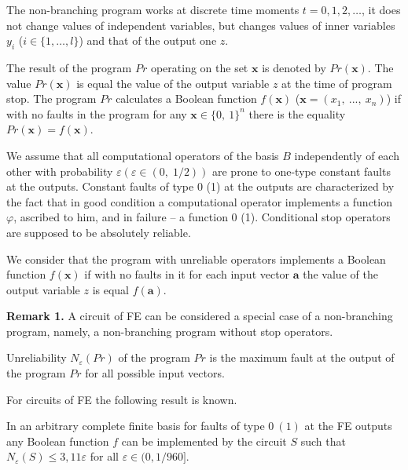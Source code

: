 \documentclass[
11pt,%
tightenlines,%
twoside,%
onecolumn,%
nofloats,%
nobibnotes,%
nofootinbib,%
superscriptaddress,%
noshowpacs,%
centertags]%
{revtex4}
\begin{document}
The non-branching program works at discrete time moments $t = 0, 1, 2, \ldots $, it does not change values
of independent variables, but changes values of inner variables $y_i$ ($i \in \{1,\ldots,l\}$) and that of the output
one $z$.

The result of the program $Pr$ operating on the set $\mathbf{x}$ is denoted
by $Pr(\mathbf{x})$. The value $Pr(\mathbf{x})$ is equal the value of the output variable
$z$ at the time of program stop. The program $Pr$  calculates a Boolean function $f(\mathbf{x})$
($\mathbf{x}=(x_1,\ ...,\ x_n)$) if with no faults in the program for any $\mathbf{x} \in\{0,\ 1\}^n$ there is the equality $Pr(\mathbf{x})=f(\mathbf{x})$.

We assume that all computational operators of the basis $B$ independently of each other with probability $\varepsilon(\varepsilon\in(0,\;1/2))$ are prone to
one-type constant faults at the outputs. Constant faults of type 0 (1) at the outputs are characterized by the fact that in good condition a computational operator implements a function $\varphi$, ascribed to him, and in failure -- a function 0 (1). Conditional stop operators are supposed to be absolutely reliable.

We consider that the program with unreliable operators implements a Boolean function $f(\mathbf{x})$ \linebreak if with no faults in it for each input vector $\mathbf{a}$ the value of the output variable $z$ is equal $f(\mathbf{a})$.

{\bf Remark 1.} A circuit of FE can be considered a special case of
a non-branching program, namely, \linebreak a non-branching program
without stop operators.

\begin{definition}Unreliability $N_\varepsilon(Pr)$ of the program $Pr$ is the maximum fault at the output of the program $Pr$ for all possible input vectors.\end{definition}

For circuits of FE the following result is known.

\begin{theorem}\label{th1}\cite{13} In an arbitrary complete
 finite basis for faults of type $0 \ (1)$ at the FE outputs any Boolean
 function $f$ can be implemented by the circuit $S$ such that
 $N_\varepsilon(S)\leq 3,11\varepsilon$ \linebreak for all $\varepsilon \in (0, 1/960]$. \end{theorem}
\end{document}
